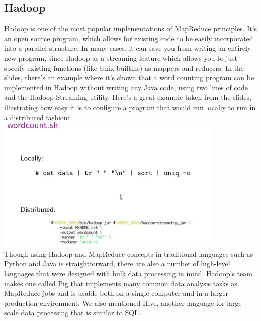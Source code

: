 \subsection{Hadoop}
Hadoop is one of the most popular implementations of MapReduce principles. It's an open source program, which allows for existing code to be easily incorporated into a parallel structure. In many cases, it can save you from writing an entirely new program, since Hadoop as a streaming feature which allows you to just specify existing functions (like Unix builtins) as mappers and reducers. In the slides, there's an example where it's shown that a word counting program can be implemented in Hadoop without writing any Java code, using two lines of code and the Hadoop Streaming utility. Here's a great example taken from the slides, illustrating how easy it is to configure a program that would run locally to run in a distributed fashion:\\ \includegraphics{hadoopstreaming}\\
Though using Hadoop and MapReduce concepts in traditional languages such as Python and Java is straightforward, there are also a number of high-level languages that were designed with bulk data processing in mind. Hadoop's team makes one called Pig that implements many common data analysis tasks as MapReduce jobs and is usable both on a single computer and in a larger production environment. We also mentioned Hive, another language for large scale data processing that is similar to SQL.